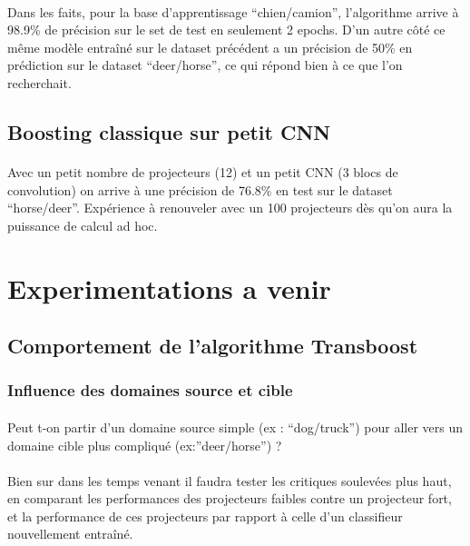 \documentclass[11 pt]{article}
\begin{document}
\paragraph{}Dans les faits, pour la base d’apprentissage “chien/camion”, l’algorithme arrive à 98.9\% de précision sur le set de test en seulement 2 epochs. D’un autre côté ce même modèle entraîné sur le dataset précédent a un précision de 50\% en prédiction sur le dataset “deer/horse”, ce qui répond bien à ce que l’on recherchait.

\subsection{Boosting classique sur petit CNN}
\paragraph{}Avec un petit nombre de projecteurs (12) et un petit CNN (3 blocs de convolution) on arrive à une précision de 76.8\% en test sur le dataset “horse/deer”. Expérience à renouveler avec un 100 projecteurs dès qu’on aura la puissance de calcul ad hoc.

\section{Experimentations a venir}
\subsection{Comportement de l'algorithme Transboost}
\subsubsection{Influence des domaines source et cible}
\paragraph{}Peut t-on partir d’un domaine source simple (ex : “dog/truck”) pour aller vers un domaine cible plus compliqué (ex:”deer/horse”) ?

\paragraph{}Bien sur dans les temps venant il faudra tester les critiques soulevées plus haut, en comparant les performances des projecteurs faibles contre un projecteur fort, et la performance de ces projecteurs par rapport à celle d'un classifieur nouvellement entraîné.
\end{document}
